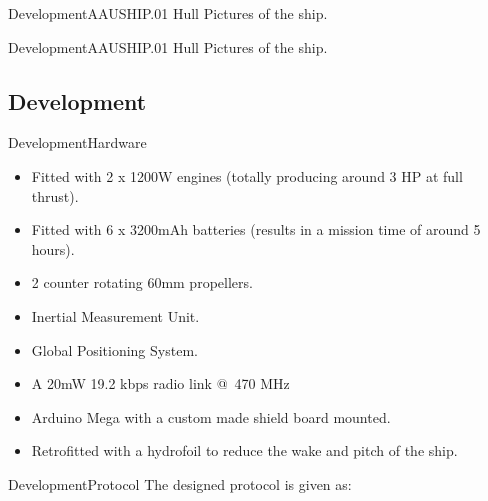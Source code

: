 \documentclass[10pt]{beamer}
\begin{document}
\begin{frame}{Development}{AAUSHIP.01 Hull}
Pictures of the ship.
\end{frame}

\begin{frame}{Development}{AAUSHIP.01 Hull}
Pictures of the ship.
\end{frame}

\subsection{Development}
\begin{frame}{Development}{Hardware}
\begin{itemize}
	\item Fitted with 2 x 1200W engines (totally producing around 3 HP at full thrust).
	\item Fitted with 6 x 3200mAh batteries (results in a mission time of around 5 hours).
	\item 2 counter rotating 60mm propellers.
	\item Inertial Measurement Unit.
	\item Global Positioning System.
	\item A 20mW 19.2 kbps radio link @ 470 MHz
	\item Arduino Mega with a custom made shield board mounted.
    \item Retrofitted with a hydrofoil to reduce the wake and pitch of the ship.
\end{itemize}
\end{frame}

\begin{frame}{Development}{Protocol}
The designed protocol is given as:
\end{frame}
\end{document}
